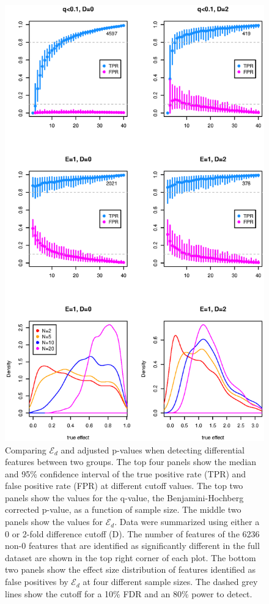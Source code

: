 \documentclass{bioinfo}
\begin{document}
\begin{figure}[tpb]
\centerline{\includegraphics[scale=0.5]{F2-yeast_TPFP.eps}}
\caption{Comparing $\mathcal{E}_{d}$ and adjusted p-values when detecting differential features between two groups. The top four panels show the   median and 95\% confidence interval of the true positive rate (TPR) and false positive rate (FPR) at different cutoff values.  The top two panels show the values for the q-value, the Benjamini-Hochberg corrected p-value, as a function of sample size. The middle two panels show the values for $\mathcal{E}_{d}$. Data were summarized using either a  0 or 2-fold difference cutoff (D). The number of features of the 6236 non-0 features that are identified as significantly different in the full dataset are shown in the top right corner of each plot. The bottom two panels show the effect size distribution of features identified as false positives by $\mathcal{E}_{d}$ at four different sample sizes. The dashed grey lines show the cutoff for a 10\% FDR and an 80\% power to detect.}
\label{fig:02}
\end{figure}
\end{document}
